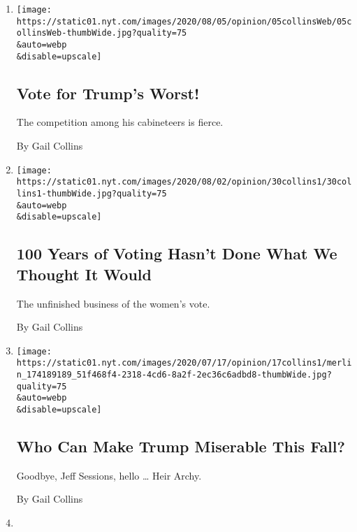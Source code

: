 \begin{enumerate}
\def\labelenumi{\arabic{enumi}.}
\item
  \href{/2020/08/05/opinion/trump-cabinet.html}{}

  \texttt{[image: https://static01.nyt.com/images/2020/08/05/opinion/05collinsWeb/05collinsWeb-thumbWide.jpg?quality=75\\\&auto=webp\\\&disable=upscale]}

  \hypertarget{vote-for-trumps-worst}{%
  \subsection{Vote for Trump's Worst!}\label{vote-for-trumps-worst}}

  The competition among his cabineteers is fierce.

  By Gail Collins
\item
  \href{/2020/07/30/opinion/sunday/19th-amendment-women-suffrage.html}{}

  \texttt{[image: https://static01.nyt.com/images/2020/08/02/opinion/30collins1/30collins1-thumbWide.jpg?quality=75\\\&auto=webp\\\&disable=upscale]}

  \hypertarget{100-years-of-voting-hasnt-done-what-we-thought-it-would}{%
  \subsection{100 Years of Voting Hasn't Done What We Thought It
  Would}\label{100-years-of-voting-hasnt-done-what-we-thought-it-would}}

  The unfinished business of the women's vote.

  By Gail Collins
\item
  \href{/2020/07/15/opinion/trump-sessions-senate.html}{}

  \texttt{[image: https://static01.nyt.com/images/2020/07/17/opinion/17collins1/merlin\_174189189\_51f468f4-2318-4cd6-8a2f-2ec36c6adbd8-thumbWide.jpg?quality=75\\\&auto=webp\\\&disable=upscale]}

  \hypertarget{who-can-make-trump-miserable-this-fall}{%
  \subsection{Who Can Make Trump Miserable This
  Fall?}\label{who-can-make-trump-miserable-this-fall}}

  Goodbye, Jeff Sessions, hello \ldots{} Heir Archy.

  By Gail Collins
\item
  \href{/2020/07/08/opinion/birth-control-supreme-court.html}{}


\end{enumerate}
